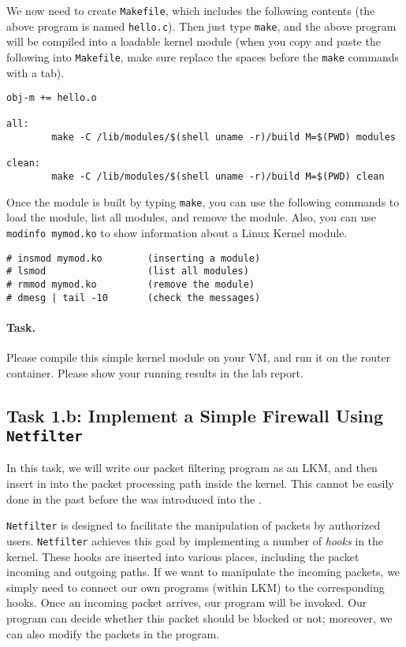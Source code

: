 We now need to create {\tt Makefile}, which includes the following
contents (the above program is named {\tt hello.c}). Then 
just type {\tt make}, and the above program will be compiled
into a loadable kernel module (when you copy and paste the following
into \texttt{Makefile}, make sure replace the spaces before the 
\texttt{make} commands with a tab).


\begin{lstlisting}
obj-m += hello.o

all:
        make -C /lib/modules/$(shell uname -r)/build M=$(PWD) modules

clean:
        make -C /lib/modules/$(shell uname -r)/build M=$(PWD) clean
\end{lstlisting}


Once the module is built by typing {\tt make}, you can use the following commands to 
load the module, list all modules, and remove the module. 
Also, you can use {\tt modinfo mymod.ko} to show information about a 
Linux Kernel module.

\begin{lstlisting}
# insmod mymod.ko        (inserting a module)
# lsmod                  (list all modules)
# rmmod mymod.ko         (remove the module)
# dmesg | tail -10       (check the messages)
\end{lstlisting}


\paragraph{Task.} Please compile this simple kernel module on 
your VM, and run it on the router container. 
Please show your running results in the lab report. 


\subsection{Task 1.b: Implement a Simple Firewall Using \texttt{Netfilter}}  


In this task, we will write our packet filtering program
as an LKM, and then insert in into the packet processing path
inside the kernel. This cannot be easily done in the past before 
the \Netfilter was introduced into the \linux.

{\tt Netfilter} is designed to facilitate the manipulation of 
packets by authorized users. {\tt Netfilter} achieves this 
goal by implementing a number of {\em hooks} in the 
\linux kernel. These hooks are inserted into various places, 
including the packet incoming and outgoing paths. 
If we want to manipulate the incoming packets, we simply
need to connect our own programs (within LKM) to the 
corresponding hooks. Once an incoming packet arrives, 
our program will be invoked. Our program can decide 
whether this packet should be blocked or not; moreover,
we can also modify the packets in the program.


